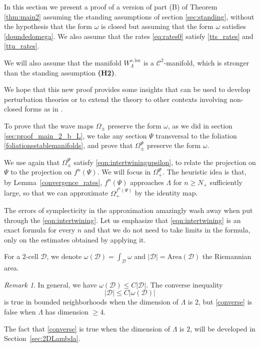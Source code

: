 \documentclass[11pt]{amsart}
\theoremstyle{definition}
\theoremstyle{remark}
\newtheorem{rem}[thm]{Remark}
\numberwithin{equation}{section}
\newcommand{\C}{\mathcal{C}}
\begin{document}
In this section we present a proof of
a version of part (B) of Theorem \ref{thm:main2} assuming the standing assumptions  of section \ref{sec:standing}, without the hypothesis that the form $\omega$ is  closed but assuming that the form $\omega$ satisfies  \eqref{doundedomega}.
We also assume that the rates \eqref{eq:rates0}  satisfy
\eqref{tts_rates} and  \eqref{ttu_rates}.


We will also assume that the manifold $W^{s,\textrm{loc}}_\Lambda$ is a $\C^2$-manifold, which is stronger than the standing assumption {\bf (H2)}.

We hope that this new proof provides some insights
that can be used  to develop perturbation theories or to
extend the theory to other contexts
involving non-closed forms  as in \cite{wojtkowski1998conformally}.



To prove that the wave maps  $\Omega_\pm$  preserve the  form $\omega$, as we did in section \ref{sec:proof_main_2_b_L}, we take any section $\Psi$ transversal to the foliation \eqref{foliationsstablemanifolds}, and prove that $\Omega^\Psi_\pm$  preserve the form $\omega$.

We use again that $\Omega^\Psi_\pm$ satisfy  \eqref{eqn:intertwiningupsilon}, to relate the projection on
$\Psi$ to the projection on $f^n(\Psi)$.
We will focus in $\Omega_+^\Psi$.
The heuristic idea is  that, by Lemma~\ref{convergence_rates},
$f^n(\Psi)$ approaches
$\Lambda$ for $n\ge N_+$ sufficiently large, so that we can approximate  $\Omega_+^{f^n(\Psi)}$ by the identity map.

The errors of symplecticity  in the approximation
amazingly wash away when put through the \eqref{eqn:intertwining}.
Let us emphasize that \eqref{eqn:intertwining} is an exact formula for every $n$
and that we do not need to take limits in the formula, only on
the estimates obtained  by applying it.


For a 2-cell $\mathscr{D}$, we denote
$\omega(\mathscr{D})= \int_\mathscr{D} \omega$ and $|\mathscr{D}| = \textrm{Area}(\mathscr{D})$  the Riemannian area.


\begin{rem}
In general, we have $\omega(\mathscr{D}) \le C |\mathscr{D}|$.
The converse inequality
\begin{equation}\label{converse}
  |\mathscr{D}| \le C |\omega(\mathscr{D})|
\end{equation}
is   true in bounded neighborhoods   when the  dimension of
$\Lambda$ is $2$,
but \eqref{converse} is false when $\Lambda$ has dimension $\ge 4$.

The fact that \eqref{converse} is true when the dimension of
$\Lambda$ is $2$, will be developed in Section~\ref{sec:2DLambda}.
\end{rem}
\end{document}
